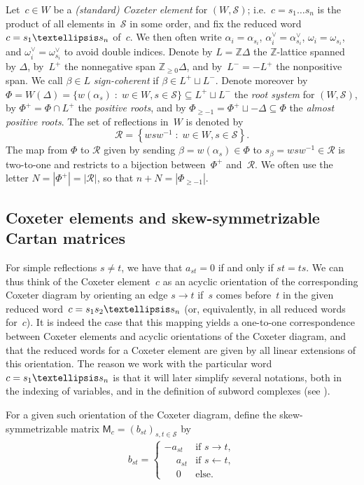 \documentclass[10pt]{amsart}
\theoremstyle{definition}\newtheorem{rema}[theo]{Remark}\newtheorem{exem}[theo]{Example}
\newcommand{\ZZ}{\mathbb{Z}}
\newcommand{\Phiplus}{\Phi^+}
\newcommand{\Phipm}{\Phi_{\geq -1}}
\newcommand{\refl}{\mathcal{R}}
\newcommand{\Dfn}[1]{\emph{#1}}
\newcommand{\sq}[1]{{\rm #1}}
\newcommand{\s}{\sq{s}}
\newcommand{\sref}{\mathcal{S}}
\renewcommand{\c}{\sq{c}}
\newcommand{\set}[2]{\left\{ #1 \;:\; #2 \right\}}
\newcommand{\bigset}[2]{\big\{ #1 \;:\; #2 \big\}}
\newcommand{\sfM}{\mathsf{M}}
\begin{document}
Let~$c \in W$ be a \Dfn{(standard) Coxeter element} for $(W,\sref)$; i.e.~$c = s_1\dots s_n$ is the product of all elements in~$\sref$ in some order, and fix the reduced word $\c = \s_1\dots\s_n$ of~$c$. We then often write $\alpha_i = \alpha_{s_i}$, $\alpha_i^\vee = \alpha_{s_i}^\vee$, $\omega_i = \omega_{s_i}$, and $\omega_i^\vee = \omega_{s_i}^\vee$ to avoid double indices. Denote by $L = \ZZ\Delta$ the $\ZZ$-lattice spanned by $\Delta$, by~$L^+$ the nonnegative span $\ZZ_{\geq 0}\Delta$, and by~$L^- = -L^+$ the nonpositive span. We call $\beta \in L$ \Dfn{sign-coherent} if $\beta \in L^+ \sqcup L^-$. Denote moreover by $\Phi = W(\Delta) = \bigset{w(\alpha_s)}{w \in W, s \in \sref} \subseteq L^+ \sqcup L^-$ the \Dfn{root system} for $(W,\sref)$, by $\Phiplus = \Phi \cap L^+$ the \Dfn{positive roots}, and by $\Phipm = \Phiplus \sqcup -\Delta \subseteq \Phi$ the \Dfn{almost positive roots}. The set of reflections in~$W$ is denoted by
\[
\refl = \set{ wsw^{-1} }{ w \in W, s \in \sref}.
\]
The map from $\Phi$ to $\refl$ given by sending $\beta = w(\alpha_s) \in \Phi$ to $s_\beta = w s w^{-1} \in \refl$ is two-to-one and restricts to a bijection between~$\Phiplus$ and~$\refl$. We often use the letter $N = |\Phiplus| = | \refl |$, so that $n+N = |\Phipm|$.
\subsection{Coxeter elements and skew-symmetrizable Cartan matrices}\label{sec:coxeterelement}

For simple reflections $s \neq t$, we have that $a_{st} = 0$ if and only if $st = ts$. We can thus think of the Coxeter element~$c$ as an acyclic orientation of the corresponding Coxeter diagram by orienting an edge $s \rightarrow t$ if~$s$ comes before~$t$ in the given reduced word~$\c = \s_1 \s_2 \dots \s_n$ (or, equivalently, in all reduced words for~$c$). It is indeed the case that this mapping yields a one-to-one correspondence between Coxeter elements and acyclic orientations of the Coxeter diagram, and that the reduced words for a Coxeter element are given by all linear extensions of this orientation. The reason we work with the particular word $\c = \s_1\dots\s_n$ is that it will later simplify several notations, both in the indexing of variables, and in the definition of subword complexes (see ).

For a given such orientation of the Coxeter diagram, define the skew-symmetri\-zable matrix $\sfM_c = (b_{st})_{s,t \in \sref}$ by
\begin{align}
b_{st} =
\begin{cases}
-a_{st} & \text{if } s \rightarrow t,\\
\phantom{-}a_{st} & \text{if } s \leftarrow t,\\
\phantom{-}0 & \text{else}.
\end{cases} \label{eq:bmatrix}
\end{align}
\end{document}
